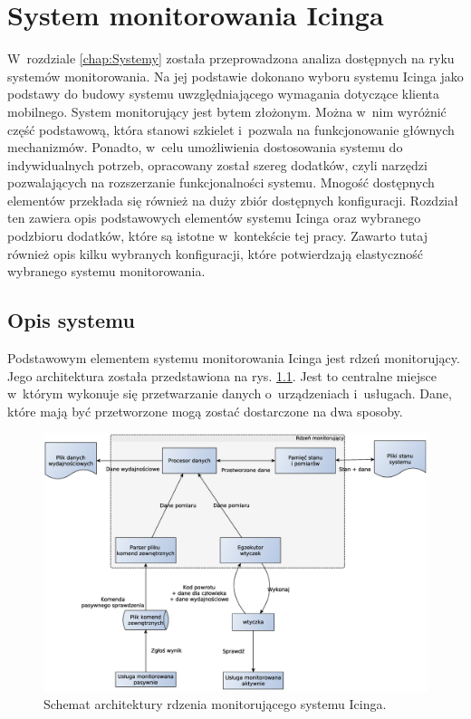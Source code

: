 \chapter{System monitorowania Icinga}
\label{chap:Icinga}

W~rozdziale \ref{chap:Systemy} została przeprowadzona analiza
dostępnych na ryku systemów monitorowania. Na jej podstawie dokonano
wyboru systemu Icinga jako podstawy do budowy systemu uwzględniającego
wymagania dotyczące klienta mobilnego. System monitorujący jest bytem
złożonym. Można w~nim wyróżnić część podstawową, która stanowi
szkielet i~pozwala na funkcjonowanie głównych mechanizmów. Ponadto,
w~celu umożliwienia dostosowania systemu do indywidualnych potrzeb,
opracowany został szereg dodatków, czyli narzędzi pozwalających na
rozszerzanie funkcjonalności systemu. Mnogość dostępnych elementów
przekłada się również na duży zbiór dostępnych konfiguracji. Rozdział
ten zawiera opis podstawowych elementów systemu Icinga oraz wybranego
podzbioru dodatków, które są istotne w~kontekście tej pracy. Zawarto
tutaj również opis kilku wybranych konfiguracji, które potwierdzają
elastyczność wybranego systemu monitorowania.

\section[Opis systemu][Opis systemu]{Opis systemu}


Podstawowym elementem systemu monitorowania Icinga jest rdzeń
monitorujący. Jego architektura została przedstawiona na
rys. \ref{fig:icingaCoreArch}. Jest to centralne miejsce w~którym
wykonuje się przetwarzanie danych o~urządzeniach i~usługach. Dane,
które mają być przetworzone mogą zostać dostarczone na dwa sposoby.

\begin{figure}[ht]
  \caption{Schemat architektury rdzenia monitorującego systemu
    Icinga.}
  \label{fig:icingaCoreArch}
\includegraphics[width=1\textwidth]{img/icingaCoreArch}
\end{figure}


